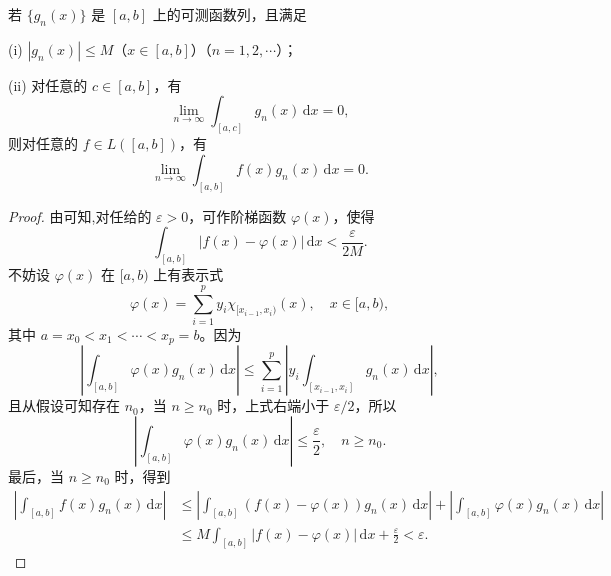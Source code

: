 \documentclass[../../main.tex]{subfiles}
\begin{document}
\begin{theorem}\label{theorem:Riemann-Lebesgue引理的推广}
若 \( \{g_n(x)\} \) 是 \([a,b]\) 上的可测函数列，且满足

(i) \( |g_n(x)| \leqslant M \)（\( x \in [a,b] \)）（\( n = 1,2,\cdots \)）；

(ii) 对任意的 \( c \in [a,b] \)，有
\[
\lim_{n \to \infty} \int_{[a,c]} g_n(x) \, \mathrm{d}x = 0,
\]
则对任意的 \( f \in L([a,b]) \)，有
\[
\lim_{n \to \infty} \int_{[a,b]} f(x) g_n(x) \, \mathrm{d}x = 0.
\]
\end{theorem}
\begin{proof}
由可知,对任给的 \( \varepsilon > 0 \)，可作阶梯函数 \( \varphi(x) \)，使得
\[
\int_{[a,b]} |f(x) - \varphi(x)| \, \mathrm{d}x < \frac{\varepsilon}{2M}.
\]
不妨设 \( \varphi(x) \) 在 \([a,b)\) 上有表示式
\[
\varphi(x) = \sum_{i=1}^p y_i \chi_{[x_{i-1},x_i)}(x), \quad x \in [a,b),
\]
其中 \( a = x_0 < x_1 < \cdots < x_p = b \)。因为
\[
\left| \int_{[a,b]} \varphi(x) g_n(x) \, \mathrm{d}x \right| \leqslant \sum_{i=1}^p \left| y_i \int_{[x_{i-1},x_i]} g_n(x) \, \mathrm{d}x \right|,
\]
且从假设可知存在 \( n_0 \)，当 \( n \geqslant n_0 \) 时，上式右端小于 \( \varepsilon/2 \)，所以
\[
\left| \int_{[a,b]} \varphi(x) g_n(x) \, \mathrm{d}x \right| \leqslant \frac{\varepsilon}{2}, \quad n \geqslant n_0.
\]
最后，当 \( n \geqslant n_0 \) 时，得到
\begin{align*}
\left| \int_{[a,b]} f(x) g_n(x) \, \mathrm{d}x \right| &\leqslant \left| \int_{[a,b]} (f(x) - \varphi(x)) g_n(x) \, \mathrm{d}x \right| + \left| \int_{[a,b]} \varphi(x) g_n(x) \, \mathrm{d}x \right| \\
&\leqslant M \int_{[a,b]} |f(x) - \varphi(x)| \, \mathrm{d}x + \frac{\varepsilon}{2} < \varepsilon.
\end{align*}
\end{proof}
\end{document}
